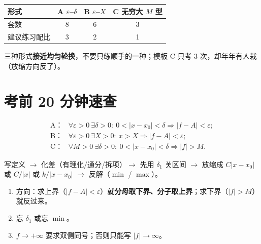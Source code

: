 \documentclass[11pt,a4paper]{ctexart}
\newcommand{\eps}{\varepsilon}
\newcommand{\abs}[1]{\left\lvert #1\right\rvert}
\begin{document}

\begin{center}
\small
\begin{tabular}{@{}lccc@{}}
\toprule
形式 & A $\eps$--$\delta$ & B $\eps$--$X$ & C 无穷大 $M$ 型 \\
\midrule
套数 & 8 & 6 & 3 \\
建议练习配比 & 3 & 2 & 1 \\
\bottomrule
\end{tabular}
\end{center}

\noindent 三种形式\textbf{接近均匀轮换}，不要只练顺手的一种；模板 C 只考 3 次，却年年有人栽（放缩方向反了）。

\section{考前 20 分钟速查}

\begin{keypoint}[三行定义]
\begin{align*}
\text{A：}& \forall\eps>0\ \exists\delta>0:\ 0<\abs{x-x_0}<\delta\Rightarrow\abs{f-A}<\eps;\\
\text{B：}& \forall\eps>0\ \exists X>0:\ x>X\Rightarrow\abs{f-A}<\eps;\\
\text{C：}& \forall M>0\ \exists\delta>0:\ 0<\abs{x-x_0}<\delta\Rightarrow\abs{f}>M .
\end{align*}
\end{keypoint}

\begin{methodbox}[五步]
写定义 $\to$ 化差（有理化/通分/拆项）$\to$ 先用 $\delta_1$ 关区间 $\to$ 放缩成 $C\abs{x-x_0}$ 或 $C/\abs{x}$ 或 $k/\abs{x-x_0}$ $\to$ 反解（$\min$ / $\max$）。
\end{methodbox}

\begin{warnbox}[三条最容易丢分的]
\begin{enumerate}
\item 方向：求上界（$\abs{f-A}<\eps$）就\textbf{分母取下界、分子取上界}；求下界（$\abs{f}>M$）就反过来。
\item 忘 $\delta_1$ 或忘 $\min$。\quad
\item $f\to+\infty$ 要求双侧同号；否则只能写 $\abs{f}\to\infty$。
\end{enumerate}
\end{warnbox}
\end{document}
